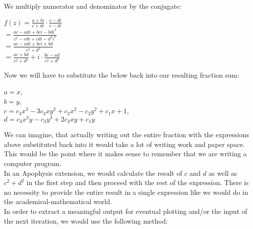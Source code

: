 \documentclass[]{article}
\begin{document}
\noindent We multiply numerator and denominator by the conjugate:

\begin{flushleft}
	\hspace{20pt} $f(z) = \frac{a + bi}{c + di} \cdot \frac{c - di}{c - di} $ \\
	\medskip
	\hspace{20pt}\hspace{2.5em}$= \frac{ac - adi + bci - bdi^2}{c^2 - cdi + cdi - d^2i^2}$ \\
	\medskip
	\hspace{20pt}\hspace{2.5em}$= \frac{ac - adi + bci + bd}{c^2 + d^2}$ \\
	\medskip
	\hspace{20pt}\hspace{2.5em}$= \frac{ac + bd}{c^2 + d^2} + i \cdot \frac{bc - ad}{c^2 + d^2}$
\end{flushleft}

\noindent Now we will have to substitute the below back into our resulting fraction sum:

\begin{flushleft}
	\hspace{20pt} $a = x$, \\
	\hspace{20pt} $b = y$, \\
	\hspace{20pt} $c = c_3x^3 - 3c_3xy^2 + c_2x^2 - c_2y^2 + c_1x + 1$, \\
	\hspace{20pt} $d = c_3x^2y - c_3y^3 + 2c_2xy + c_1y$ \\
\end{flushleft}

\noindent We can imagine, that actually writing out the entire fraction with the expressions above substituted back into it would take a lot of writing work and paper space. This would be the point where it makes sense to remember that we are writing a computer program. \\

\noindent In an Apophysis extension, we would calculate the result of $c$ and $d$ as well as $c^2 + d^2$ in the first step and then proceed with the rest of the expression. There is no necessity to provide the entire result in a single expression like we would do in the academical-mathematical world. \\

\noindent In order to extract a meaningful output for eventual plotting and/or the input of the next iteration, we would use the following method:
\end{document}
